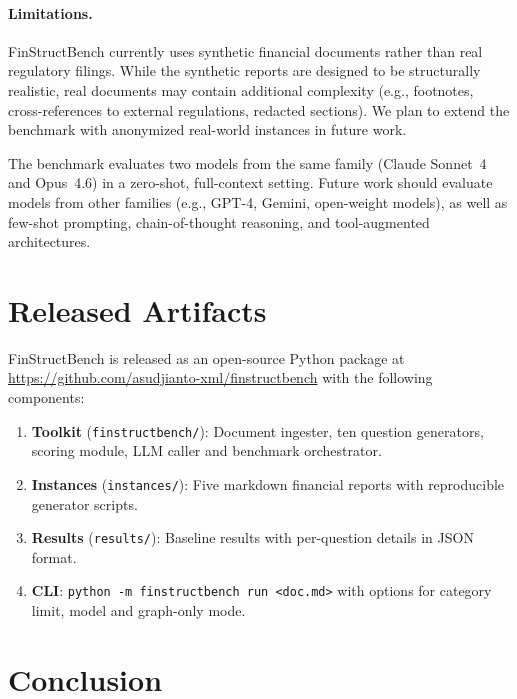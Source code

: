 \documentclass[11pt]{article}
\begin{document}
\paragraph{Limitations.}
FinStructBench currently uses synthetic financial documents rather
than real regulatory filings.  While the synthetic reports are
designed to be structurally realistic, real documents may contain
additional complexity (e.g., footnotes, cross-references to external
regulations, redacted sections).  We plan to extend the benchmark
with anonymized real-world instances in future work.

The benchmark evaluates two models from the same family (Claude
Sonnet~4 and Opus~4.6) in a zero-shot, full-context setting.  Future
work should evaluate models from other families (e.g., GPT-4, Gemini,
open-weight models), as well as few-shot prompting, chain-of-thought
reasoning, and tool-augmented architectures.

\section{Released Artifacts}
\label{sec:artifacts}

FinStructBench is released as an open-source Python package at
\url{https://github.com/asudjianto-xml/finstructbench} with the
following components:

\begin{enumerate}[leftmargin=2em]
  \item \textbf{Toolkit} (\texttt{finstructbench/}): Document ingester,
    ten question generators, scoring module, LLM caller and benchmark
    orchestrator.
  \item \textbf{Instances} (\texttt{instances/}): Five markdown financial
    reports with reproducible generator scripts.
  \item \textbf{Results} (\texttt{results/}): Baseline results with
    per-question details in JSON format.
  \item \textbf{CLI}: \texttt{python -m finstructbench run <doc.md>}
    with options for category limit, model and graph-only mode.
\end{enumerate}

\section{Conclusion}
\label{sec:conclusion}
\end{document}
